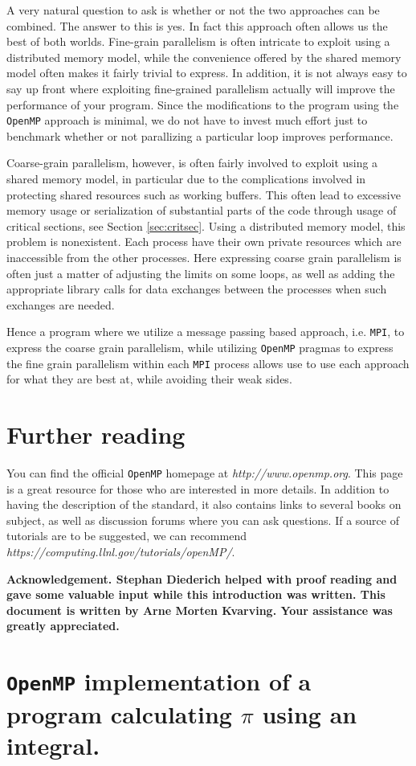 \documentclass[twoside, 11pt, a4paper]{article}
\begin{document}
A very natural question to ask is whether or not the two approaches can
be combined. The answer to this is yes. In fact this approach often allows us the best of
both worlds. Fine-grain parallelism is often intricate to exploit using a distributed memory 
model, while the convenience offered by the shared memory model often makes it fairly trivial
to express. In addition, it is not always easy to say up front where exploiting fine-grained
parallelism actually will improve the performance of your program.  Since the modifications
to the program using the \texttt{OpenMP} approach is minimal, we do not have to
invest much effort just to benchmark whether or not parallizing a particular loop improves
performance.

Coarse-grain parallelism, however, is often fairly involved to exploit using a shared
memory model, in particular due to the complications involved in protecting shared resources
such as working buffers. This often lead to excessive memory usage or serialization of
substantial parts of the code through usage of critical sections, see Section \ref{sec:critsec}.
Using a distributed memory model, this problem is nonexistent. Each process have 
their own private resources which are inaccessible from the other processes.
Here expressing coarse grain parallelism is often just a matter of adjusting the limits
on some loops, as well as adding the appropriate library calls for data exchanges
between the processes when such exchanges are needed.

Hence a program where we utilize a message passing based approach, i.e. \texttt{MPI}, to
express the coarse grain parallelism, while utilizing \texttt{OpenMP} pragmas to express
the fine grain parallelism within each \texttt{MPI} process allows use to use each
approach for what they are best at, while avoiding their weak sides.
\newpage
\section{Further reading}
You can find the official \texttt{OpenMP} homepage at \emph{http://www.openmp.org}. This page is a great
resource for those who are interested in more details. In addition to having the description
of the standard, it also contains links to several books on subject, as well as discussion forums
where you can ask questions. If a source of tutorials are to be suggested,
we can recommend \emph{https://computing.llnl.gov/tutorials/openMP/}.

\bf Acknowledgement\rm. Stephan Diederich helped with proof reading
and gave some valuable input while this introduction was written.
This document is written by Arne Morten Kvarving. Your assistance was greatly appreciated.
\nocite{openmp}
\nocite{openmptut}


\appendix
\section{\texttt{OpenMP} implementation of a program calculating $\pi$ using an integral.}
\label{app:openmp-integrate}

\end{document}

